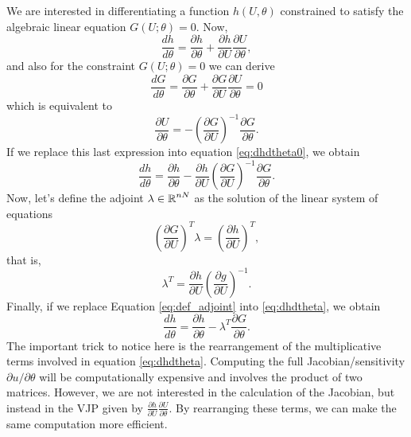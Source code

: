 We are interested in differentiating a function $h(U, \theta)$ constrained to satisfy the algebraic linear equation $G(U; \theta) = 0$.
Now,
\begin{equation}
    \frac{dh}{d\theta} = \frac{\partial h}{\partial \theta} + \frac{\partial h }{\partial U} \frac{\partial U}{\partial \theta},
    \label{eq:dhdtheta0}
\end{equation}
and also for the constraint $G(U; \theta)=0$ we can derive
\begin{equation}
    \frac{dG}{d\theta} 
    = 
    \frac{\partial G}{\partial \theta} 
    + 
    \frac{\partial G}{\partial U} \frac{\partial U}{\partial \theta}
    =
    0
\end{equation}
which is equivalent to 
\begin{equation}
    \frac{\partial U}{\partial \theta} 
    = 
    - \left( \frac{\partial G}{\partial U} \right)^{-1} \frac{\partial G}{\partial \theta}.
\end{equation}
If we replace this last expression into equation \eqref{eq:dhdtheta0}, we obtain
\begin{equation}
    \frac{dh}{d\theta} 
    =
    \frac{\partial h}{\partial \theta} - \frac{\partial h}{\partial U} \left( \frac{\partial G}{\partial U} \right)^{-1} \frac{\partial G}{\partial \theta}.
    \label{eq:dhdtheta}
\end{equation}
Now, let's define the adjoint $\lambda \in \operatorname{\mathbb{R}}^{nN}$ as the solution of the linear system of equations 
\begin{equation}
    \left( \frac{\partial G}{\partial U}\right)^T \lambda =  \left( \frac{\partial h}{\partial U} \right)^T,
\end{equation}
that is,
\begin{equation}
    \lambda^T = \frac{\partial h}{\partial U} \left( \frac{\partial g}{\partial U} \right)^{-1}.
    \label{eq:def_adjoint}
\end{equation}
Finally, if we replace Equation \eqref{eq:def_adjoint} into \eqref{eq:dhdtheta}, we obtain 
\begin{equation}
    \frac{dh}{d\theta} 
    =
    \frac{\partial h}{\partial \theta} - \lambda^T \frac{\partial G}{\partial \theta}.
\end{equation}
The important trick to notice here is the rearrangement of the multiplicative terms involved in equation \eqref{eq:dhdtheta}. Computing the full Jacobian/sensitivity $\partial u / \partial \theta$ will be computationally expensive and involves the product of two matrices. However, we are not interested in the calculation of the Jacobian, but instead in the VJP given by $\frac{\partial h}{\partial U} \frac{\partial U}{\partial \theta}$. By rearranging these terms, we can make the same computation more efficient. 

